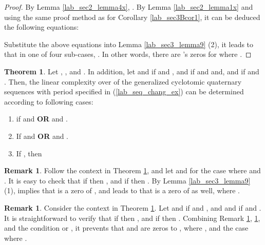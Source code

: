 \documentclass{mcom-l}
\theoremstyle{definition}
\newtheorem{sec3_B_remark1}[sec3_remark1]{Remark}
\newtheorem{sec3_B_remark2}[sec3_remark1]{Remark}
\newtheorem{sec3thm2}[sec3thm1]{Theorem}
\numberwithin{equation}{section}
\begin{document}
      \begin{proof}
      By Lemma \ref{lab_sec2_lemma4x}, . By Lemma \ref{lab_sec2_lemma1x} and using the same proof method as for Corollary \ref{lab_sec3Bcor1}, it can be deduced the following equations:
       
      Substitute the above equations into Lemma \ref{lab_sec3_lemma9} (2), it leads to that in one of four sub-cases, . In other words, there are 's zeros for  where .
      \end{proof} 
       \begin{sec3thm2}\label{lab_MainThorem_02}
         Let , ,  and . In addition, let  and  if  and ,  and  if  and  and,  and  if  and . Then, the linear complexity over  of the generalized cyclotomic quaternary sequences with period  specified in (\ref{lab_seq_chang_ex}) can be determined according to following cases:
          \begin{enumerate} \item if  and  \textbf{OR}  and .
          
\item If  and  \textbf{OR}  and  .
          
\item If , then 
           
\end{enumerate}
      \end{sec3thm2}
      
      \begin{sec3_B_remark1}\label{Lab_sec3_B_remark1}
      Follow the context in Theorem \ref{lab_MainThorem_02}, and let   and  for the case where  and . It is easy to check that if  then , and if  then . By Lemma \ref{lab_sec3_lemma9} (1),  implies  that  is a zero of , and  leads to that  is a zero of  as well, where .
      \end{sec3_B_remark1}
      
      \begin{sec3_B_remark2}\label{Lab_sec3_B_remark2}
      Consider the context in Theorem \ref{lab_MainThorem_02}. Let  and  if  and , and  and  if  and . It is straightforward to verify that if  then , and if  then . Combining Remark \ref{Lab_sec3_B_remark1},  \ref{Lab_sec3_B_remark2}, and the condition   or , it prevents that  and  are zeros to , where , and the case where .
      \end{sec3_B_remark2}
      
\end{document}
